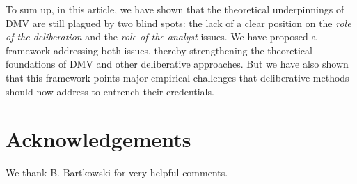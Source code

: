 \documentclass[version=3.21, pagesize, twoside=off, bibliography=totoc, DIV=calc, fontsize=12pt, a4paper, french, english]{scrartcl}
\newenvironment{acknowledgements}{
	\section*{Acknowledgements}
}{
}
\begin{document}
{To sum up, in this article, we have shown that the theoretical underpinnings of DMV are still plagued by two blind spots: the lack of a clear position on the \emph{role of the deliberation} and the \emph{role of the analyst} issues. We have proposed a framework addressing both issues, thereby strengthening the theoretical foundations of DMV and other deliberative approaches.  But we have also shown that this framework points major empirical challenges that deliberative methods should now address to entrench their credentials.


\begin{acknowledgements}
We thank B. Bartkowski for very helpful comments.
\end{acknowledgements}



\end{document}
